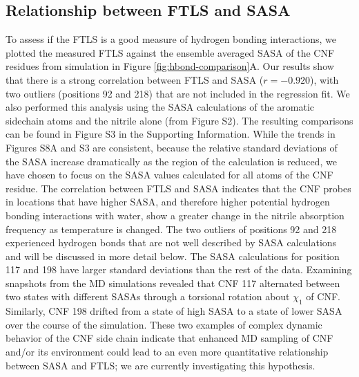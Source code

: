 \subsection{Relationship between FTLS and SASA}

To assess if the FTLS is a good measure of hydrogen bonding interactions, we plotted the measured FTLS against the ensemble averaged SASA of the CNF residues from simulation in Figure \ref{fig:hbond-comparison}A.
Our results show that there is a strong correlation between FTLS and SASA ($r = -0.920$), with two outliers (positions 92 and 218) that are not included in the regression fit.
We also performed this analysis using the SASA calculations of the aromatic sidechain atoms and the nitrile alone (from Figure S2).
The resulting comparisons can be found in Figure S3 in the Supporting Information.
While the trends in Figures S8A and S3 are consistent, because the relative standard deviations of the SASA increase dramatically as the region of the calculation is reduced, we have chosen to focus on the SASA values calculated for all atoms of the CNF residue.
The correlation between FTLS and SASA indicates that the CNF probes in locations that have higher SASA, and therefore higher potential hydrogen bonding interactions with water, show a greater change in the nitrile absorption frequency as temperature is changed.
The two outliers of positions 92 and 218 experienced hydrogen bonds that are not well described by SASA calculations and will be discussed in more detail below.
The SASA calculations for position 117 and 198 have larger standard deviations than the rest of the data.
Examining snapshots from the MD simulations revealed that CNF 117 alternated between two states with different SASAs through a torsional rotation about $\chi_1$ of CNF.
Similarly, CNF 198 drifted from a state of high SASA to a state of lower SASA over the course of the simulation.
These two examples of complex dynamic behavior of the CNF side chain indicate that enhanced MD sampling of CNF and/or its environment could lead to an even more quantitative relationship between SASA and FTLS; we are currently investigating this hypothesis. 

